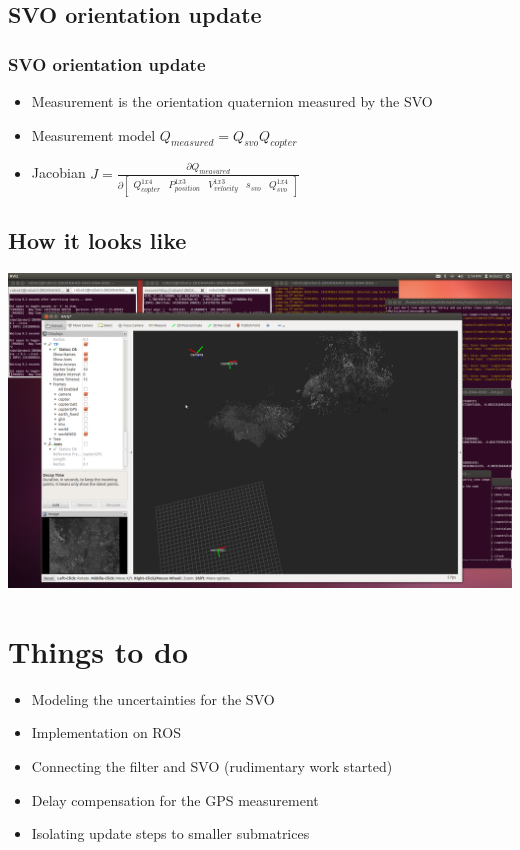 \documentclass{beamer}
\begin{document}
\subsection{SVO orientation update}
\begin{frame}
\frametitle{SVO orientation update}
  \begin{itemize}
  \item Measurement is the orientation quaternion measured by the SVO
  \item Measurement model $Q_{measured} = Q_{svo}Q_{copter}$
  \item Jacobian $J = \frac{\partial Q_{measured}}{\partial \begin{bmatrix}Q_{copter}^{1x4} & P_{position}^{1x3} & V_{velocity}^{1x3}& s_{svo} & Q_{svo}^{1x4}\end{bmatrix}}$
  \end{itemize} 
\end{frame}

\subsection{How it looks like}
\begin{frame}
\includegraphics[width=.9\hsize]{screen.png}
\end{frame}

\section{Things to do}
\begin{frame}
\begin{itemize}
  \item Modeling the uncertainties for the SVO
  \item Implementation on ROS
  \item Connecting the filter and SVO (rudimentary work started)
  \item Delay compensation for the GPS measurement
  \item Isolating update steps to smaller submatrices
\end{itemize}

\end{frame}
\end{document}
